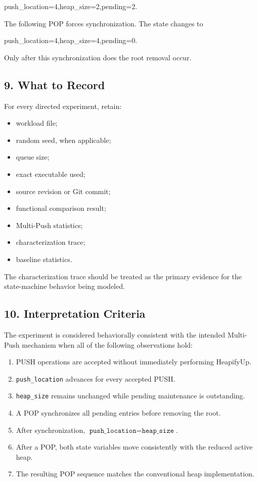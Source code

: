 \documentclass[11pt,a4paper]{article}
\begin{document}
push_location=4,heap_size=2,pending=2.

The following POP forces synchronization. The state changes to

push_location=4,heap_size=4,pending=0.

Only after this synchronization does the root removal occur.

\subsection{9. What to Record}

For every directed experiment, retain:

\begin{itemize}
\item workload file;
\item random seed, when applicable;
\item queue size;
\item exact executable used;
\item source revision or Git commit;
\item functional comparison result;
\item Multi-Push statistics;
\item characterization trace;
\item baseline statistics.
\end{itemize}

The characterization trace should be treated as the primary evidence for
the state-machine behavior being modeled.

\subsection{10. Interpretation Criteria}

The experiment is considered behaviorally consistent with the intended
Multi-Push mechanism when all of the following observations hold:

\begin{enumerate}
\item PUSH operations are accepted without immediately performing
HeapifyUp.

\item \texttt{push\_location} advances for every accepted PUSH.

\item \texttt{heap\_size} remains unchanged while pending maintenance
is outstanding.

\item A POP synchronizes all pending entries before removing the root.

\item After synchronization,
\(\texttt{push\_location}=\texttt{heap\_size}\).

\item After a POP, both state variables move consistently with the
reduced active heap.

\item The resulting POP sequence matches the conventional heap
implementation.


\end{enumerate}
\end{document}
